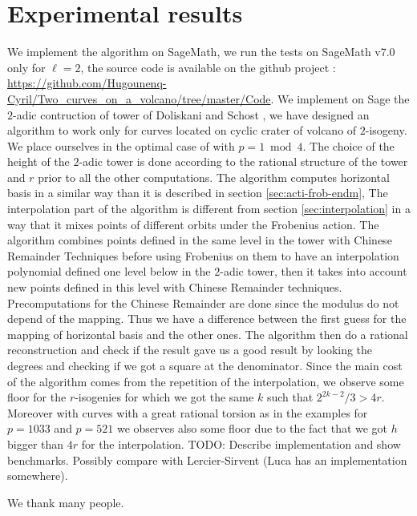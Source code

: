 \documentclass{lms}
\newcommand{\todo}[1]{{\color{red}TODO: #1}}
\begin{document}
\section{Experimental results}
\label{sec:implem}
We implement the algorithm on SageMath, we run the tests on SageMath v7.0 only for $\ell=2$, the source code is available on the github project : \url{https://github.com/Hugounenq-Cyril/Two_curves_on_a_volcano/tree/master/Code}.
We implement on Sage the $2$-adic contruction of tower of Doliskani and Schost \cite{DoSc12}, we have designed an algorithm to work only for curves located on cyclic crater of volcano of $2$-isogeny. 
 We place ourselves in the optimal case of \cite{DoSc12} with $p = 1 \bmod 4$. 
 \newline 
The choice of the height of the $2$-adic tower is done according to the rational structure of the tower and $r$ prior to all the other computations. The algorithm computes horizontal basis in a similar way than it is described in section \ref{sec:acti-frob-endm}, 
\newline
The interpolation part of the algorithm is different from section \ref{sec:interpolation} in a way that it mixes points of different orbits under the Frobenius action. The algorithm combines points defined in the same level in the tower with Chinese Remainder Techniques before using Frobenius on them to have an interpolation polynomial defined one level below in the $2$-adic tower, then it takes into account new points defined in this level with Chinese Remainder techniques. Precomputations for the Chinese Remainder are done since the modulus do not depend of the mapping. Thus we have a difference between the first guess for the mapping of horizontal basis and the other ones. The algorithm then do a rational reconstruction and check if the result gave us a good result by looking the degrees and checking if we got a square at the denominator.
 \newline
  Since the main cost of the algorithm comes from the repetition of the interpolation, we observe some floor for the $r$-isogenies for which we got the same $k$ such that $2^{2k-2}/3>4r$. Moreover with curves with a great rational torsion as in the examples for $p=1033$ and $p=521$ we observes also some floor due to the fact that we got $h$ bigger than $4r$ for the interpolation. 
\todo{Describe implementation and show benchmarks. Possibly compare
  with Lercier-Sirvent (Luca has an implementation somewhere).}

\begin{acknowledgements}
  We thank many people.
\end{acknowledgements}
\end{document}
